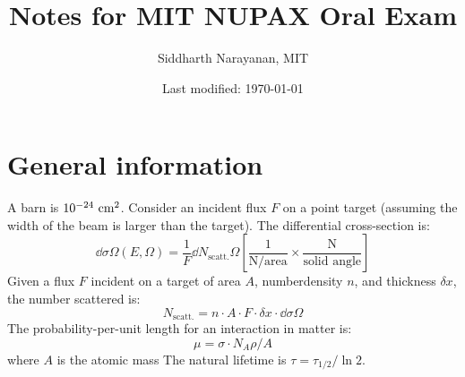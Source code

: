 

\pagestyle{fancy}
\chead{\today}
\setcounter{section}{-1}


\title{Notes for MIT NUPAX Oral Exam}
\date{Last modified: \today}
\author{Siddharth Narayanan, MIT}

\maketitle

\tableofcontents

\section{General information}

A barn is $10^{-24}~\text{cm}^2$. Consider an incident flux $F$ on a point target (assuming the width of the beam is larger than the target). The differential cross-section is:
\begin{equation}
  \dd{\sigma}{\Omega}(E,\Omega) = \frac{1}{F} \dd{N_\text{scatt.}}{\Omega} \left[\frac{1}{\text{N/area}} \times \frac{\text{N}}{\text{solid angle}}\right]
\end{equation}
Given a flux $F$ incident on a target of area $A$, numberdensity $n$, and thickness $\delta x$, the number scattered is:
\begin{equation}
  N_\text{scatt.} = n\cdot A\cdot F\cdot \delta x \cdot \dd\sigma\Omega
\end{equation}
The probability-per-unit length for an interaction in matter is:
\begin{equation}
  \mu = \sigma\cdot N_A\rho/A
\end{equation}
where $A$ is the atomic mass
\noindent The natural lifetime is $\tau = \tau_{1/2}/\ln 2$.

